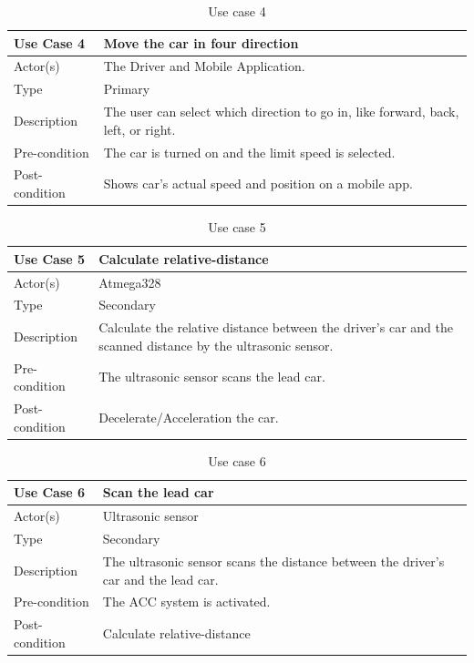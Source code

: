 \documentclass[12pt,a4paper]{report}
\begin{document}
\begin{table}[H]
\begin{center}
\caption{Use case 4}
\label{tab:use6}
\begin{tabular}{|p{3cm}|p{11cm}|}
\hline
\textbf{Use Case 4} & \textbf{Move the car in four direction}\\ 
\hline
Actor(s)&The Driver and Mobile Application.\\\hline
Type&Primary\\\hline
Description&The user can select which direction to go in, like forward, back, left, or right.\\\hline
Pre-condition&The car is turned on and the limit speed is selected.\\\hline
Post-condition&Shows car’s actual speed and position on a mobile app.\\\hline
\end{tabular}
\end{center}  
\end{table}
\begin{table}[H]
\begin{center}
\caption{Use case 5}
\label{tab:use8}
\begin{tabular}{|p{3cm}|p{11cm}|}
\hline
\textbf{Use Case 5} & \textbf{Calculate relative-distance}\\ 
\hline
Actor(s)&Atmega328\\\hline
Type&Secondary\\\hline
Description&Calculate the relative distance between the driver's car and the scanned distance by the ultrasonic sensor.\\\hline
Pre-condition&The ultrasonic sensor scans the lead car.\\\hline
Post-condition&Decelerate/Acceleration the car.\\\hline
\end{tabular}
\end{center}  
\end{table}
\begin{table}[H]
\begin{center}
\caption{Use case 6}
\label{tab:use10}
\begin{tabular}{|p{3cm}|p{11cm}|}
\hline
\textbf{Use Case 6} & \textbf{Scan the lead car}\\ 
\hline
Actor(s)&Ultrasonic sensor\\\hline
Type&Secondary\\\hline
Description&The ultrasonic sensor scans the distance between the driver's car and the lead car.\\\hline
Pre-condition&The ACC system is activated.\\\hline
Post-condition&Calculate relative-distance\\\hline
\end{tabular}
\end{center}  
\end{table}
\end{document}
